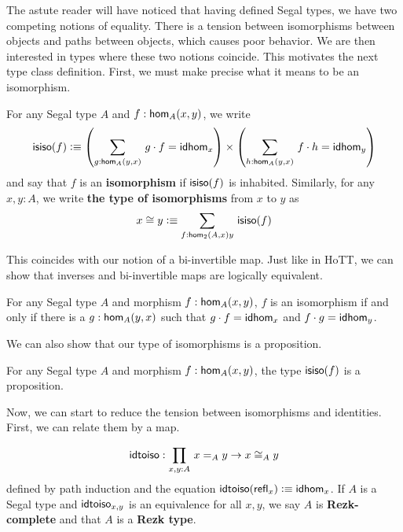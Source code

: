\documentclass[main.tex]{subfiles}
\begin{document}
The astute reader will have noticed that having defined Segal types, we have two competing notions of equality. There is a tension
between isomorphisms between objects and paths between objects, which causes poor behavior. We are then interested in types where these
two notions coincide. This motivates the next type class definition. First, we must make precise what it means to be an isomorphism.
\begin{definition}
    For any Segal type $A$ and $f : \ho[A]{x}{y}$, we write
    \[
    \iso(f) \defeq \left ( \sm{g :\ho[A]{y}{x}}g \cdot f = \idhom{x} \right ) \times \left ( \sm{h : \ho[A]{y}{x}} f \cdot h = \idhom{y} \right )
    \]
    and say that $f$ is an \textbf{isomorphism} if $\iso(f)$ is inhabited. Similarly, for any $x,y : A$, we write \textbf{the type of isomorphisms}
    from $x$ to $y$ as 
    \[
    x \cong y \defeq \sm{f : \ho{A}{x}{y}}\iso(f)
    \]
\end{definition}
This coincides with our notion of a bi-invertible map. Just like in HoTT, we can show that inverses and bi-invertible maps are logically
equivalent.

\begin{lemma}[RS17 10.1]
    For any Segal type $A$ and morphism $f : \ho[A]{x}{y}$, $f$ is an isomorphism if and only if there is a $g : \ho[A]{y}{x}$ such that 
    $g \cdot f = \idhom{x}$ and $f \cdot g = \idhom{y}$.
\end{lemma}
We can also show that our type of isomorphisms is a proposition.
\begin{lemma}[RS17 10.2]
    For any Segal type $A$ and morphism $f : \ho[A]{x}{y}$, the type $\iso(f)$ is a proposition.
\end{lemma}
Now, we can start to reduce the tension between isomorphisms and identities. First, we can relate them by a map.
\begin{lemma}[RS17 10.5]
    \begin{equation}
        \idi : \prd{x,y:A}x =_A y \to x \cong_A y
    \end{equation}
    defined by path induction and the equation $\idi(\refl{x}) \defeq \idhom{x}$. If $A$ is a Segal type and 
    $\idi_{x,y}$ is an equivalence for all $x,y$, we say $A$ is \textbf{Rezk-complete} and that $A$ is a \textbf{Rezk type}.
\end{lemma}
\end{document}
